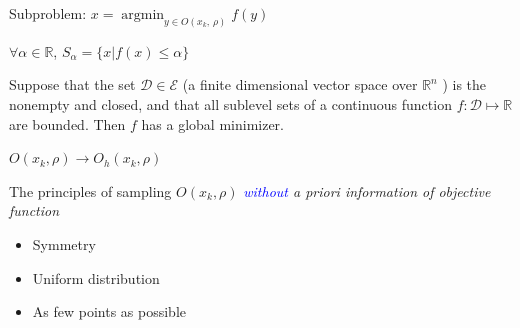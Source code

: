 \documentclass{beamer}
\DeclareMathOperator*{\argmin}{\mathrm{argmin}}
\begin{document}
\begin{frame}{Subproblem: $x=\argmin_{y\in O(x_k,\,\rho)} f(y)$}

\begin{definition}
	$\forall \alpha \in \mathbb{R}$, $S_{\alpha} = \{x | f(x) \leq \alpha\}$
\end{definition}

\begin{theorem}[Weierstrass]
	Suppose that the set $\mathcal{D}\in\mathcal{E}$ (a
	finite dimensional vector space over $\mathbb{R}^n$ ) is the nonempty
	and closed, and that all sublevel sets of a continuous
	function $f: \mathcal{D} \mapsto \mathbb{R}$ are bounded. Then $f$ has a global
	minimizer.
\end{theorem}

\end{frame}

\begin{frame}{$O(x_k, \rho)\rightarrow O_h(x_k, \rho)$}

The principles of sampling $O(x_k,\rho)$
\textit{\textcolor{blue}{without} a priori information of objective function}
\begin{itemize}
	\item Symmetry
	\item Uniform distribution
	\item As few points as possible
\end{itemize}

\end{frame}
\end{document}
